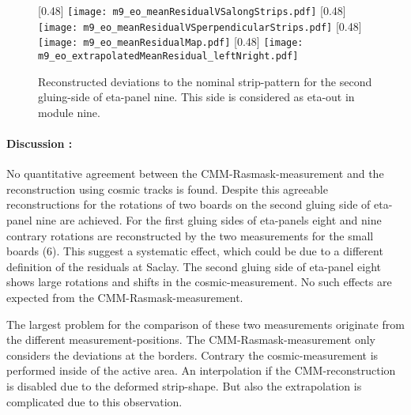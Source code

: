 \documentclass[
twoside,            %
BCOR1.4cm,          %
10pt,               %
headings=normal,    %
headsepline,        %
clearplainpage,		%
final,              %
div=14,
open=right,
bibliography=toc
]{scrreprt}
\begin{document}
\begin{figure}[!h]
	\centering
	[0.48\textwidth]
	{\texttt{[image: m9\_eo\_meanResidualVSalongStrips.pdf]}}
	\hfill
	[0.48\textwidth]
	{\texttt{[image: m9\_eo\_meanResidualVSperpendicularStrips.pdf]}}
	\hfill
	[0.48\textwidth]
	{\texttt{[image: m9\_eo\_meanResidualMap.pdf]}}
	\hfill
	[0.48\textwidth]
	{\texttt{[image: m9\_eo\_extrapolatedMeanResidual\_leftNright.pdf]}}
	\vspace{-2mm}
	\caption{
		Reconstructed deviations to the nominal strip-pattern for the second gluing-side of eta-panel nine.
		This side is considered as eta-out in module nine.
	}
	\label{eta9gs2} 
\end{figure}

\newpage

\paragraph{Discussion :}

No quantitative agreement between the CMM-Rasmask-measurement and the reconstruction using cosmic tracks is found.
Despite this agreeable reconstructions for the rotations of two boards on the second gluing side of eta-panel nine are achieved.
For the first gluing sides of eta-panels eight and nine contrary rotations are reconstructed by the two measurements for the small boards (6).
This suggest a systematic effect, which could be due to a different definition of the residuals at Saclay.
The second gluing side of eta-panel eight shows large rotations and shifts in the cosmic-measurement.
No such effects are expected from the CMM-Rasmask-measurement.

The largest problem for the comparison of these two measurements originate from the different measurement-positions.
The CMM-Rasmask-measurement only considers the deviations at the borders.
Contrary the cosmic-measurement is performed inside of the active area.
An interpolation if the CMM-reconstruction is disabled due to the deformed strip-shape.
But also the extrapolation is complicated due to this observation.
\end{document}
